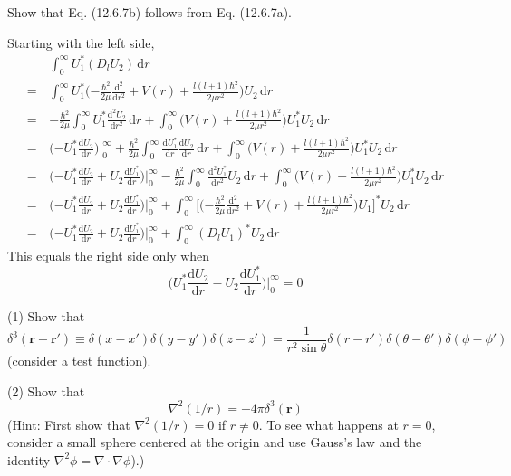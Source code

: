 \documentclass[../principles-of-quantum-mechanics.tex]{subfiles}
\begin{document}
\begin{questions}
		\question Show that Eq. (12.6.7b) follows from Eq. (12.6.7a).
		\begin{solution}
			Starting with the left side,
			\begin{align*}
				&\int_0^\infty U_1^*(D_lU_2)\,\mathrm{d}r \\
				=\,&\int_0^\infty U_1^*\Big({-\frac{\hbar^2}{2\mu}}\frac{\mathrm{d}^2}{\mathrm{d}r^2} + V(r) + \frac{l(l + 1)\hbar^2}{2\mu r^2}\Big)U_2\,\mathrm{d}r \\
				=\,&{-\frac{\hbar^2}{2\mu}}\int_0^\infty U_1^*\frac{\mathrm{d}^2U_2}{\mathrm{d}r^2}\,\mathrm{d}r + \int_0^\infty\Big(V(r) + \frac{l(l + 1)\hbar^2}{2\mu r^2}\Big)U_1^* U_2\,\mathrm{d}r \\
				=\,&\Big({-U_1^*}\frac{\mathrm{d}U_2}{\mathrm{d}r}\Big)\Big|_0^{\infty} + \frac{\hbar^2}{2\mu}\int_0^\infty\frac{\mathrm{d}U_1^*}{\mathrm{d}r}\frac{\mathrm{d}U_2}{\mathrm{d}r}\,\mathrm{d}r + \int_0^\infty\Big(V(r) + \frac{l(l + 1)\hbar^2}{2\mu r^2}\Big)U_1^* U_2\,\mathrm{d}r \\
				=\,&\Big({-U_1^*}\frac{\mathrm{d}U_2}{\mathrm{d}r} + U_2\frac{\mathrm{d}U_1^*}{\mathrm{d}r}\Big)\Big|_0^{\infty} - \frac{\hbar^2}{2\mu}\int_0^\infty\frac{\mathrm{d}^2U_1^*}{\mathrm{d}r^2}U_2\,\mathrm{d}r  + \int_0^\infty\Big(V(r) + \frac{l(l + 1)\hbar^2}{2\mu r^2}\Big)U_1^* U_2\,\mathrm{d}r \\
				=\,&\Big({-U_1^*}\frac{\mathrm{d}U_2}{\mathrm{d}r} + U_2\frac{\mathrm{d}U_1^*}{\mathrm{d}r}\Big)\Big|_0^{\infty} + \int_0^\infty\Big[\Big({-\frac{\hbar^2}{2\mu}}\frac{\mathrm{d}^2}{\mathrm{d}r^2} + V(r) + \frac{l(l + 1)\hbar^2}{2\mu r^2}\Big)U_1\Big]^*U_2\,\mathrm{d}r \\
				=\,&\Big({-U_1^*}\frac{\mathrm{d}U_2}{\mathrm{d}r} + U_2\frac{\mathrm{d}U_1^*}{\mathrm{d}r}\Big)\Big|_0^{\infty} + \int_0^\infty (D_lU_1)^*U_2\,\mathrm{d}r
			\end{align*}
			This equals the right side only when
			$$\Big(U_1^*\frac{\mathrm{d}U_2}{\mathrm{d}r} - U_2\frac{\mathrm{d}U_1^*}{\mathrm{d}r}\Big)\Big|_0^{\infty} = 0$$
		\end{solution}
	
		\question (1) Show that
		$$\delta^3(\mathbf{r}- \mathbf{r}') \equiv \delta(x - x')\delta(y - y')\delta(z - z') = \frac{1}{r^2\sin\theta}\delta(r - r')\delta(\theta - \theta')\delta(\phi - \phi')$$
		(consider a test function).
		
		(2) Show that
		$$\nabla^2(1/r) = -4\pi\delta^3(\mathbf{r})$$
		(Hint: First show that $\nabla^2(1/r) = 0$ if $r \neq 0$. To see what happens at $r =0$, consider a small sphere centered at the origin and use Gauss's law and the identity $\nabla^2\phi = \nabla\cdot\nabla\phi$).)
		

\end{questions}
\end{document}
